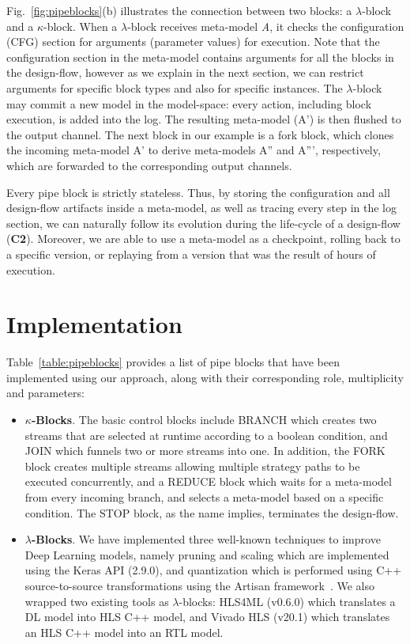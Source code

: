 Fig.~\ref{fig:pipeblocks}(b) illustrates the connection between two blocks: a $\lambda$-block and a $\kappa$-block. When a $\lambda$-block receives meta-model \textit{A}, it checks the configuration (CFG) section for arguments (parameter values) for execution. Note that the configuration section in the meta-model contains arguments for all the blocks in the design-flow, however as we explain in the next section, we can restrict arguments for specific block types and also for specific instances. The $\lambda$-block may commit a new model in the model-space: every action, including block execution, is added into the log. The resulting meta-model (A') is then flushed to the output channel. The next block in our example is a fork block, which clones the incoming meta-model A' to derive meta-models A'' and A''', respectively, which are forwarded to the corresponding output channels. 

Every pipe block is strictly stateless. Thus, by storing the configuration and all design-flow artifacts inside a meta-model, as well as tracing every step in the log section, we can naturally follow its evolution during the life-cycle of a design-flow (\textbf{C2}). Moreover, we are able to use a meta-model as a checkpoint, rolling back to a specific version, or replaying from a version that was the result of hours of execution.



\section{Implementation}\label{sec:implementation}



Table~\ref{table:pipeblocks} provides a list of pipe blocks that have been implemented using our approach, along with their corresponding role, multiplicity and parameters:
\begin{itemize}

\item \textbf{$\kappa$-Blocks}. The basic control blocks include BRANCH which creates two streams that are selected at runtime according to a boolean condition, and JOIN which funnels two or more streams into one. In addition, the FORK block creates multiple streams allowing multiple strategy paths to be executed concurrently, and a REDUCE block which waits for a meta-model from every incoming branch, and selects a meta-model based on a specific condition. The STOP block, as the name implies, terminates the design-flow.

\item \textbf{$\lambda$-Blocks}. We have implemented three well-known techniques to improve Deep Learning models, namely pruning and scaling which are implemented using the Keras API (2.9.0), and quantization which is performed using C++ source-to-source transformations using the Artisan framework~\cite{fccm20_artisan}. We also wrapped two existing tools as $\lambda$-blocks: HLS4ML (v0.6.0) which translates a DL model into HLS C++ model, and Vivado HLS (v20.1) which translates an HLS C++ model into an RTL model. 

\end{itemize}

